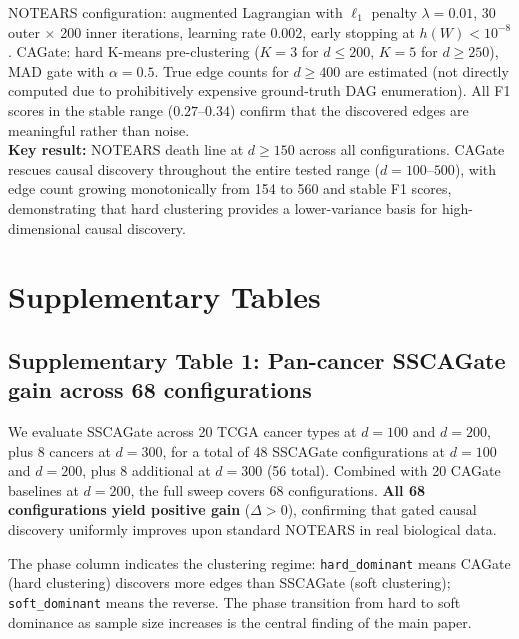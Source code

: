 \documentclass[12pt,a4paper]{article}
\begin{document}
\begin{table}[htbp]
{\footnotesize NOTEARS configuration: augmented Lagrangian with $\ell_1$ penalty
$\lambda = 0.01$, 30 outer $\times$ 200 inner iterations, learning rate $0.002$,
early stopping at $h(W) < 10^{-8}$. CAGate: hard K-means pre-clustering ($K = 3$
for $d \leq 200$, $K = 5$ for $d \geq 250$), MAD gate with $\alpha = 0.5$. True
edge counts for $d \geq 400$ are estimated (not directly computed due to
prohibitively expensive ground-truth DAG enumeration). All F1 scores in the
stable range ($0.27$--$0.34$) confirm that the discovered edges are meaningful
rather than noise. \\[4pt]
\textbf{Key result:} NOTEARS death line at $d \geq 150$ across all configurations.
CAGate rescues causal discovery throughout the entire tested range ($d = 100$--$500$),
with edge count growing monotonically from 154 to 560 and stable F1 scores,
demonstrating that hard clustering provides a lower-variance basis for high-dimensional
causal discovery.}
\end{table}

\section{Supplementary Tables}

\subsection{Supplementary Table 1: Pan-cancer SSCAGate gain across 68 configurations}
\label{sec:stab1}

We evaluate SSCAGate across 20 TCGA cancer types at $d = 100$ and $d = 200$,
plus 8 cancers at $d = 300$, for a total of 48 SSCAGate configurations at $d=100$ and $d=200$, plus 8 additional at $d=300$ (56 total).
Combined with 20 CAGate baselines at $d = 200$, the full sweep covers 68
configurations. \textbf{All 68 configurations yield positive gain}
($\Delta > 0$), confirming that gated causal discovery uniformly improves upon
standard NOTEARS in real biological data.

The phase column indicates the clustering regime: \texttt{hard\_dominant} means
CAGate (hard clustering) discovers more edges than SSCAGate (soft clustering);
\texttt{soft\_dominant} means the reverse. The phase transition from hard to
soft dominance as sample size increases is the central finding of the main paper.
\end{document}
